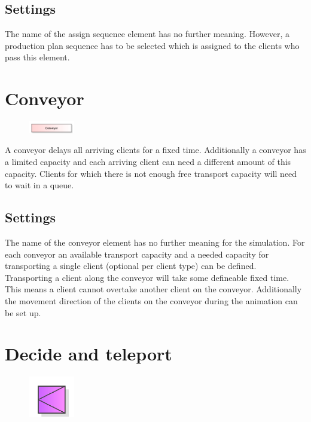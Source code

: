 \subsection*{Settings}

The name of the assign sequence element has no further meaning. However, a production plan sequence
has to be selected which is assigned to the clients who pass this element.


\section{Conveyor}
\label{ref:ModelElementConveyor}

\begin{figure}
\vspace{-22pt}
\includegraphics[width=2cm]{imageModelElementConveyor.png}
\vspace{-22pt}
\end{figure}

A conveyor delays all arriving clients for a fixed time.
Additionally a conveyor has a limited capacity and each
arriving client can need a different amount of this capacity.
Clients for which there is not enough free transport capacity
will need to wait in a queue.

\subsection*{Settings}

The name of the conveyor element has no further meaning for the simulation.
For each conveyor an available transport capacity and a needed capacity for
transporting a single client (optional per client type) can be defined.
Transporting a client along the conveyor will take some defineable fixed
time. This means a client cannot overtake another client on the conveyor.
Additionally the movement direction of the clients on the conveyor during
the animation can be set up.


\section{Decide and teleport}
\label{ref:ModelElementDecideAndTeleport}

\begin{figure}
\vspace{-22pt}
\includegraphics[width=2cm]{imageModelElementDecideAndTeleport.png}
\vspace{-22pt}
\end{figure}

